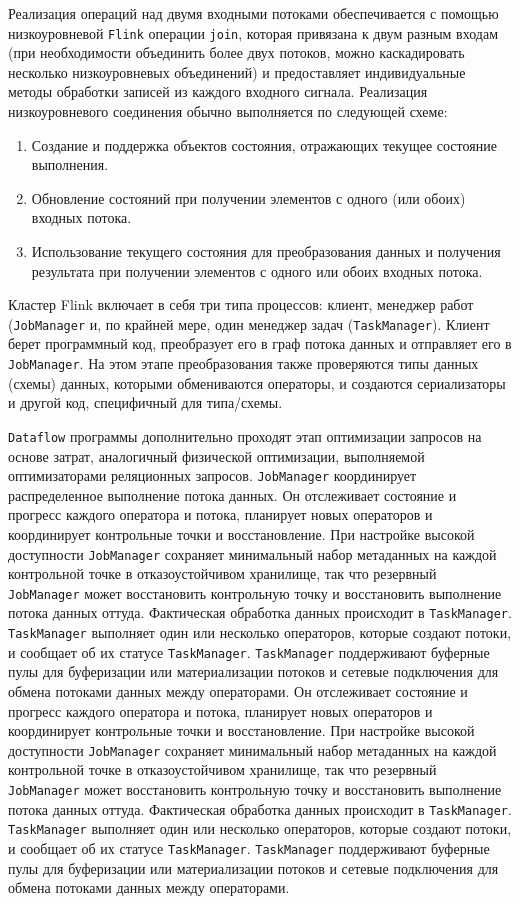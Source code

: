 Реализация операций над двумя входными потоками обеспечивается с помощью низкоуровневой \texttt{Flink} операции \texttt{join}, которая привязана к двум разным входам (при необходимости объединить более двух потоков, можно каскадировать несколько низкоуровневых объединений) и предоставляет индивидуальные методы обработки записей из каждого входного сигнала. 
Реализация низкоуровневого соединения обычно выполняется по следующей схеме:
\begin{enumerate}
  \item Создание и поддержка объектов состояния, отражающих текущее состояние выполнения.
  \item Обновление состояний при получении элементов с одного (или обоих) входных потока.
  \item Использование текущего состояния для преобразования данных и получения результата при получении элементов с одного или обоих входных потока.
\end{enumerate}

Кластер Flink включает в себя три типа процессов: клиент, менеджер работ (\texttt{JobManager} и, по крайней мере, один менеджер задач (\texttt{TaskManager}). Клиент берет программный код, преобразует его в граф потока данных и отправляет его в \texttt{JobManager}. На этом этапе преобразования также проверяются типы данных (схемы) данных, которыми обмениваются операторы, и создаются сериализаторы и другой код, специфичный для типа/схемы. 

\texttt{Dataflow} программы дополнительно проходят этап оптимизации запросов на основе затрат, аналогичный физической оптимизации, выполняемой оптимизаторами реляционных запросов.
\texttt{JobManager} координирует распределенное выполнение потока данных. 
Он отслеживает состояние и прогресс каждого оператора и потока, планирует новых операторов и координирует контрольные точки и восстановление.
При настройке высокой доступности \texttt{JobManager} сохраняет минимальный набор метаданных на каждой контрольной точке в отказоустойчивом хранилище, так что резервный \texttt{JobManager} может восстановить контрольную точку и восстановить выполнение потока данных оттуда. 
Фактическая обработка данных происходит в \texttt{TaskManager}.
\texttt{TaskManager} выполняет один или несколько операторов, которые создают потоки, и сообщает об их статусе \texttt{TaskManager}. 
\texttt{TaskManager} поддерживают буферные пулы для буферизации или материализации потоков и сетевые подключения для обмена потоками данных между операторами.
Он отслеживает состояние и прогресс каждого оператора и потока, планирует новых операторов и координирует контрольные точки и восстановление.
При настройке высокой доступности \texttt{JobManager} сохраняет минимальный набор метаданных на каждой контрольной точке в отказоустойчивом хранилище, так что резервный \texttt{JobManager} может восстановить контрольную точку и восстановить выполнение потока данных оттуда. 
Фактическая обработка данных происходит в \texttt{TaskManager}.
\texttt{TaskManager} выполняет один или несколько операторов, которые создают потоки, и сообщает об их статусе \texttt{TaskManager}. 
\texttt{TaskManager} поддерживают буферные пулы для буферизации или материализации потоков и сетевые подключения для обмена потоками данных между операторами.

